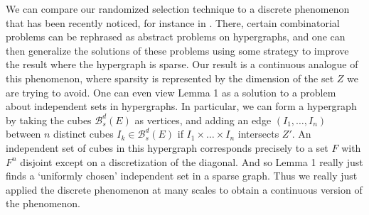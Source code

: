 \documentclass[usenames,dvipsnames]{article}
\theoremstyle{plain}
\theoremstyle{plain}
\begin{document}
We can compare our randomized selection technique to a discrete phenomenon that has been recently noticed, for instance in \cite{BaloghMorrisSamotij}. There, certain combinatorial problems can be rephrased as abstract problems on hypergraphs, and one can then generalize the solutions of these problems using some strategy to improve the result where the hypergraph is sparse. Our result is a continuous analogue of this phenomenon, where sparsity is represented by the dimension of the set $Z$ we are trying to avoid. One can even view Lemma 1 as a solution to a problem about independent sets in hypergraphs. In particular, we can form a hypergraph by taking the cubes $\mathcal{B}^d_s(E)$ as vertices, and adding an edge $(I_1, \dots, I_n)$ between $n$ distinct cubes $I_k \in \mathcal{B}^d_s(E)$ if $I_1 \times \dots \times I_n$ intersects $Z'$. An independent set of cubes in this hypergraph corresponds precisely to a set $F$ with $F^n$ disjoint except on a discretization of the diagonal. And so Lemma 1 really just finds a `uniformly chosen' independent set in a sparse graph. Thus we really just applied the discrete phenomenon at many scales to obtain a continuous version of the phenomenon.




\end{document}
